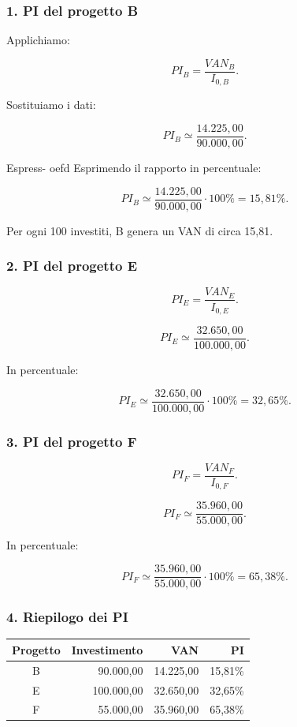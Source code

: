\subsubsection*{1. PI del progetto B}

\noindent Applichiamo:

\[
PI_B=\frac{VAN_B}{I_{0,B}}.
\]

\noindent Sostituiamo i dati:

\[
PI_B
\simeq
\frac{14.225{,}00}{90.000{,}00}.
\]

\noindent Espress- oefd %
\noindent Esprimendo il rapporto in percentuale:

\[
PI_B
\simeq
\frac{14.225{,}00}{90.000{,}00}\cdot100\%
=
\boxed{15{,}81\%}.
\]

\noindent Per ogni 100 investiti,
B genera un VAN di circa 15,81.


\subsubsection*{2. PI del progetto E}

\[
PI_E=\frac{VAN_E}{I_{0,E}}.
\]

\[
PI_E
\simeq
\frac{32.650{,}00}{100.000{,}00}.
\]

\noindent In percentuale:

\[
PI_E
\simeq
\frac{32.650{,}00}{100.000{,}00}\cdot100\%
=
\boxed{32{,}65\%}.
\]


\subsubsection*{3. PI del progetto F}

\[
PI_F=\frac{VAN_F}{I_{0,F}}.
\]

\[
PI_F
\simeq
\frac{35.960{,}00}{55.000{,}00}.
\]

\noindent In percentuale:

\[
PI_F
\simeq
\frac{35.960{,}00}{55.000{,}00}\cdot100\%
=
\boxed{65{,}38\%}.
\]


\subsubsection*{4. Riepilogo dei PI}

\begin{center}
    \begin{tabular}{|c|r|r|r|}
        \hline
        \textbf{Progetto}
        & \textbf{Investimento}
        & \textbf{VAN}
        & \textbf{PI} \\
        \hline
        B & 90.000,00 & 14.225,00 & 15,81\% \\
        E & 100.000,00 & 32.650,00 & 32,65\% \\
        F & 55.000,00 & 35.960,00 & 65,38\% \\
        \hline
    \end{tabular}
\end{center}

